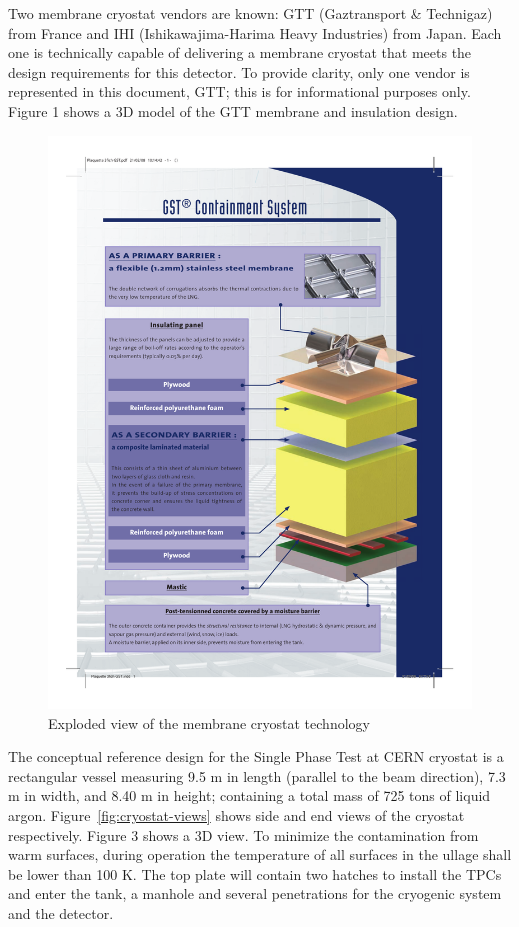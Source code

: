 Two membrane cryostat vendors are known: GTT (Gaztransport \& Technigaz) from France and IHI (Ishikawajima-Harima Heavy Industries) from Japan. Each one is technically capable of delivering a membrane cryostat that meets the design requirements for this detector. To provide clarity, only one vendor is represented in this document, GTT; this is for informational purposes only. Figure 1 shows a 3D model of the GTT membrane and insulation design.


\begin{figure}
\begin{center}
\includegraphics[width=.9\textwidth]{figures/membrane-exploded-view} %
\caption[Exploded view of the membrane cryostat technology]{\label{fig:lar-org} Exploded view of the membrane cryostat technology}
\end{center}
\end{figure}

The conceptual reference design for the Single Phase Test at CERN cryostat is a rectangular vessel measuring 9.5 m in length (parallel to the beam direction), 7.3 m in width, and 8.40 m in height; containing a total mass of 725 tons of liquid argon. Figure~\ref{fig:cryostat-views} shows side and end views of the cryostat respectively. Figure 3 shows a 3D view. To minimize the contamination from warm surfaces, during operation the temperature of all surfaces in the ullage shall be lower than 100 K. The top plate will contain two hatches to install the TPCs and enter the tank, a manhole and several penetrations for the cryogenic system and the detector.

